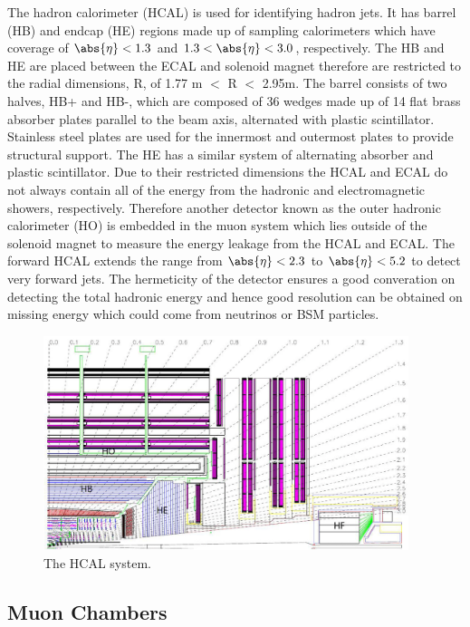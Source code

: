 The hadron calorimeter (HCAL) is used for identifying hadron jets. It has barrel (HB) and endcap (HE) regions made up of sampling calorimeters which have coverage of $\abs{\eta}<1.3$ and $1.3<\abs{\eta}<3.0$, respectively. The HB and HE are placed between the ECAL and solenoid magnet therefore are restricted to the radial dimensions, R, of 1.77 m $<$ R $<$ 2.95m. The barrel consists of two halves, HB+ and HB-, which are composed of 36 wedges made up of 14 flat brass absorber plates parallel to the beam axis, alternated with plastic scintillator. Stainless steel plates are used for the innermost and outermost plates to provide structural support. The HE has a similar system of alternating absorber and plastic scintillator.
Due to their restricted dimensions the HCAL and ECAL do not always contain all of the energy from the hadronic and electromagnetic showers, respectively. Therefore another detector known as the outer hadronic calorimeter (HO) is embedded in the muon system which lies outside of the solenoid magnet to measure the energy leakage from the HCAL and ECAL.
The forward HCAL extends the range from $\abs{\eta}<2.3$ to $\abs{\eta}<5.2$ to detect very forward jets. The hermeticity of the detector ensures a good converation on detecting the total hadronic energy and hence good resolution can be obtained on missing energy which could come from neutrinos or BSM particles.

\begin{figure}[ht!]
\centering
    \includegraphics[width=0.95\textwidth]{images/HCAL.png}
    \caption{The HCAL system.}
    \label{fig:hcal}
\end{figure}

\subsection{Muon Chambers}

